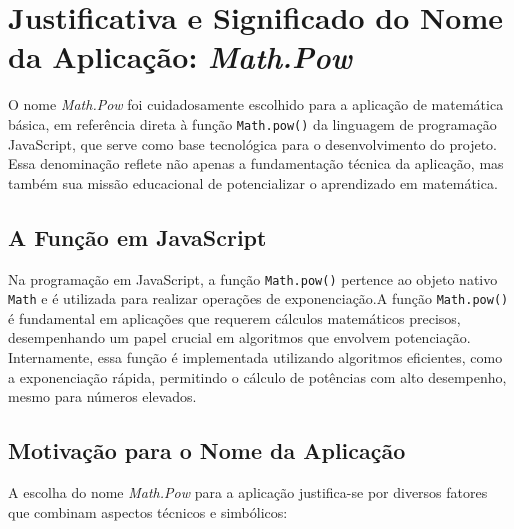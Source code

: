 \section{Justificativa e Significado do Nome da Aplicação: \textit{Math.Pow}}

O nome \textit{Math.Pow} foi cuidadosamente escolhido para a aplicação de matemática básica, em referência direta à função \texttt{Math.pow()} da linguagem de programação JavaScript, que serve como base tecnológica para o desenvolvimento do projeto. Essa denominação reflete não apenas a fundamentação técnica da aplicação, mas também sua missão educacional de potencializar o aprendizado em matemática.

\subsection{A Função  em JavaScript}



Na programação em JavaScript, a função \texttt{Math.pow()} pertence ao objeto nativo \texttt{Math} e é utilizada para realizar operações de exponenciação.A função \texttt{Math.pow()} é fundamental em aplicações que requerem cálculos matemáticos precisos, desempenhando um papel crucial em algoritmos que envolvem potenciação. Internamente, essa função é implementada utilizando algoritmos eficientes, como a exponenciação rápida, permitindo o cálculo de potências com alto desempenho, mesmo para números elevados.

\subsection{Motivação para o Nome da Aplicação}

A escolha do nome \textit{Math.Pow} para a aplicação justifica-se por diversos fatores que combinam aspectos técnicos e simbólicos:

